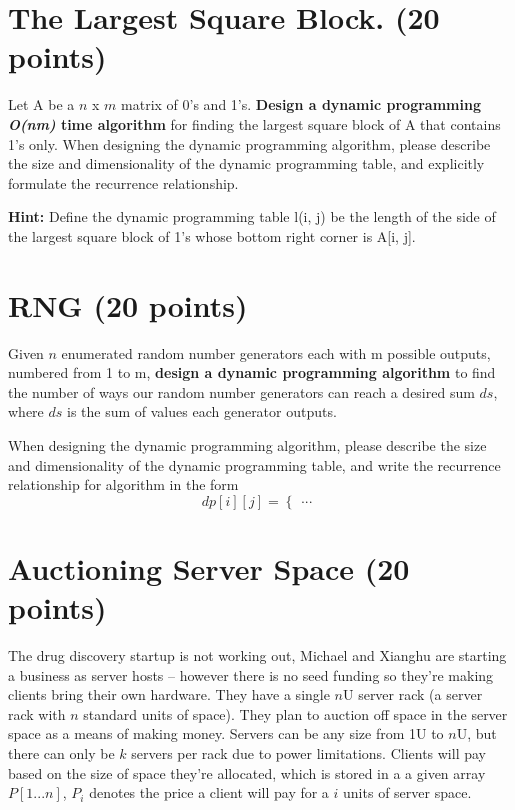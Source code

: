 \documentclass{article}[12pt]
\begin{document}
\pagebreak

\section{The Largest Square Block. (20 points)}
Let A be a $n$ x $m$ matrix of 0's and 1's. \textbf{Design a dynamic programming \textit{O(nm)} time algorithm} for finding the largest square block of A that contains 1's only. When designing the dynamic programming algorithm, please describe the size and dimensionality of the dynamic programming table, and explicitly formulate the recurrence relationship. 

\noindent\textbf{Hint:} Define the dynamic programming table l(i, j) be the length of the side of the largest square block of 1's whose bottom right corner is A[i, j].


\section{RNG (20 points) }

Given $n$ enumerated random number generators each with m possible outputs, numbered from 1 to m, \textbf{design a dynamic programming algorithm} to find the number of ways our random number generators can reach a desired sum $ds$, where $ds$ is the sum of values each generator outputs.

When designing the dynamic programming algorithm, please describe the size and dimensionality of the dynamic programming table, and write the recurrence relationship for algorithm in the form
    \[
    dp[i][j] = \begin{cases}
        ...
    \end{cases}
    \]

\newpage
\section{Auctioning Server Space (20 points)}

The drug discovery startup is not working out, Michael and Xianghu are starting a business as server hosts -- however there is no seed funding so they're making clients bring their own hardware. They have a single $n$U server rack (a server rack with $n$ standard units of space). They plan to auction off space in the server space as a means of making money. Servers can be any size from 1U to $n$U, but there can only be $k$ servers per rack due to power limitations. Clients will pay based on the size of space they're allocated, which is stored in a a given array $P[1...n]$, $P_i$ denotes the price a client will pay for a $i$ units of server space.
\end{document}
